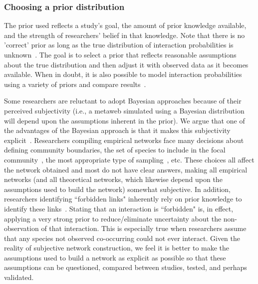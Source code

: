 \documentclass[12pt]{article}
\begin{document}
\begin{spacing}{2.0}



    \subsubsection*{Choosing a prior distribution}  

      The prior used reflects a study's goal, the amount of prior knowledge available, and the strength of researchers' belief in that knowledge. Note that there is no 'correct' prior as long as the true distribution of interaction probabilities is unknown~\citep{Spiegelhalter2000}. The goal is to select a prior that reflects reasonable assumptions about the true distribution and then adjust it with observed data as it becomes available. When in doubt, it is also possible to model interaction probabilities using a variety of priors and compare results~\citep{Spiegelhalter2000}.


      Some researchers are reluctant to adopt Bayesian approaches because of their perceived subjectivity (i.e., a metaweb simulated using a Bayesian distribution will depend upon the assumptions inherent in the prior). We argue that one of the advantages of the Bayesian approach is that it makes this subjectivity explicit~\citep{Spiegelhalter2000}. Researchers compiling empirical networks face many decisions about defining community boundaries, the set of species to include in the focal community~\citep{Jordano2016}, the most appropriate type of sampling~\citep{Wirta2014}, etc. These choices all affect the network obtained and most do not have clear answers, making all empirical networks (and all theoretical networks, which likewise depend upon the assumptions used to build the network) somewhat subjective. In addition, researchers identifying ``forbidden links" inherently rely on prior knowledge to identify these links~\citep{Jordano2016}. Stating that an interaction is ``forbidden" is, in effect, applying a very strong prior to reduce/eliminate uncertainty about the non-observation of that interaction. This is especially true when researchers assume that any species not observed co-occurring could not ever interact. Given the reality of subjective network construction, we feel it is better to make the assumptions used to build a network as explicit as possible so that these assumptions can be questioned, compared between studies, tested, and perhaps validated. 



\end{spacing}
\end{document}
